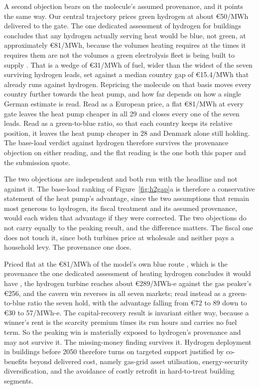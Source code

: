 A second objection bears on the molecule's assumed provenance, and it points the
same way. Our central trajectory prices green hydrogen at about \euro{}50/MWh
delivered to the gate. The one dedicated assessment of hydrogen for buildings
concludes that any hydrogen actually serving heat would be blue, not green,
at approximately \euro{}81/MWh, because the volumes heating requires at the times it
requires them are not the volumes a green electrolysis fleet is being built to
supply \citep{Dickel2024ET29}. That is a wedge of \euro{}31/MWh of fuel, wider than
the widest of the seven surviving hydrogen leads, set against a median country gap
of \euro{}15.4/MWh that already runs against hydrogen. Repricing the molecule on
that basis moves every country further towards the heat pump, and how far depends on
how a single German estimate is read. Read as a European price, a flat \euro{}81/MWh at
every gate leaves the heat pump cheaper in all 29 and closes every one of the seven
leads. Read as a green-to-blue ratio, so that each country keeps its relative position,
it leaves the heat pump cheaper in 28 and Denmark alone still holding. The base-load
verdict against hydrogen therefore survives the provenance objection on either reading,
and the flat reading is the one both this paper and the submission quote.

The two objections are independent and both run with the headline and not against it.
The base-load ranking of Figure~\ref{fig:h2gap}a is therefore a conservative statement
of the heat pump's advantage, since the two assumptions that remain most generous to
hydrogen, its fiscal treatment and its assumed provenance, would each widen that
advantage if they were corrected. The two objections do not carry equally to the peaking
result, and the difference matters. The fiscal one does not touch it, since both
turbines price at wholesale and neither pays a household levy. The provenance one does.

Priced flat at the \euro{}81/MWh of the model's own blue route
\citep{IEAGHG2022blue}, which is the provenance the one dedicated assessment of heating
hydrogen concludes it would have \citep{Dickel2024ET29}, the hydrogen turbine reaches
about \euro{}289/MWh-e against the gas peaker's
\euro{}256, and the cavern win reverses in all seven markets; read instead as a
green-to-blue ratio the seven hold, with the advantage falling from \euro{}72 to 89 down
to \euro{}30 to 57/MWh-e. The capital-recovery result is invariant either way, because a
winner's rent is the scarcity premium times its run hours and carries no fuel term. So
the peaking win is materially exposed to hydrogen's provenance and may not survive it.
The missing-money finding survives it. Hydrogen deployment in buildings before 2050
therefore turns on targeted support justified by co-benefits beyond delivered cost,
namely gas-grid asset utilisation, energy-security diversification, and the avoidance of
costly retrofit in hard-to-treat building segments.

